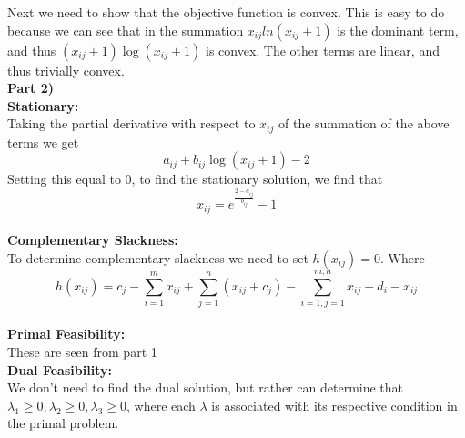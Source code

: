 \documentclass[12pt,letter]{article}
\newcommand{\ppart}[1]{\vspace{2mm}\large\textbf{\\Part {#1})\vspace{2mm}}\normalsize\\}
\newcommand{\condition}[1]{\vspace{1mm}\textbf{{#1}:}\normalsize\\}
\begin{document}
Next we need to show that the objective function is convex. This is easy to do
because we can see that in the summation $x_{ij}ln(x_{ij}+1)$ is the dominant 
term, and thus $(x_{ij}+1)\log(x_{ij}+1)$ is convex. The other terms are 
linear, and thus trivially convex.
\ppart{2}
\condition{Stationary}
Taking the partial derivative with respect to $x_{ij}$ of the summation of the 
above terms we get
\[
    a_{ij} + b_{ij}\log(x_{ij}+1) - 2
\]
Setting this equal to 0, to find the stationary solution, we find that
\[
    x_{ij} = e^{\frac{2-a_{ij}}{b_{ij}}}-1
\]
\\
\condition{Complementary Slackness}
To determine complementary slackness we need to set $h(x_{ij}) = 0$. Where
\[
    h(x_{ij}) = c_j - \sum\limits_{i=1}^mx_{ij} + \sum\limits_{j=1}^n(x_{ij} + c_j)
     - \sum\limits_{i=1,j=1}^{m,n}x_{ij} - d_i -x_{ij}
 \]
\\
\condition{Primal Feasibility}
These are seen from part 1
\\
\condition{Dual Feasibility}
We don't need to find the dual solution, but rather can determine that 
$\lambda_1\geq0, \lambda_2\geq0, \lambda_3\geq0$, where each $\lambda$ is associated
with its respective condition in the primal problem. 
\end{document}

